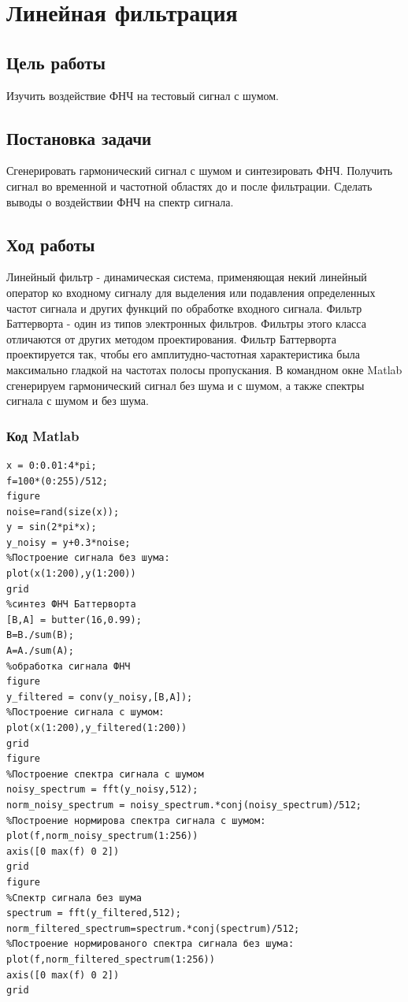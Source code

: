 \chapter{Линейная фильтрация}

\section{Цель работы}
Изучить воздействие ФНЧ на тестовый сигнал с шумом.

\section{Постановка задачи}
Сгенерировать гармонический сигнал с шумом и синтезировать ФНЧ. Получить сигнал во временной и частотной областях до и после фильтрации. Сделать выводы о воздействии ФНЧ на спектр сигнала.

\section{Ход работы}
Линейный фильтр - динамическая система, применяющая некий линейный оператор ко входному сигналу для выделения или подавления определенных частот сигнала и других функций по обработке входного сигнала.
Фильтр Баттерворта - один из типов электронных фильтров. Фильтры этого класса отличаются от других методом проектирования. Фильтр Баттерворта проектируется так, чтобы его амплитудно-частотная характеристика
была максимально гладкой на частотах полосы пропускания.
В командном окне Matlab сгенерируем гармонический сигнал без шума
и с шумом, а также спектры сигнала с шумом и без шума. 

\subsection{Код Matlab}
\begin{lstlisting}
x = 0:0.01:4*pi;
f=100*(0:255)/512;
figure
noise=rand(size(x));
y = sin(2*pi*x);
y_noisy = y+0.3*noise;
%Построение сигнала без шума:
plot(x(1:200),y(1:200))
grid
%синтез ФНЧ Баттерворта
[B,A] = butter(16,0.99);
B=B./sum(B);
A=A./sum(A);
%обработка сигнала ФНЧ
figure
y_filtered = conv(y_noisy,[B,A]);
%Построение сигнала с шумом:
plot(x(1:200),y_filtered(1:200))
grid
figure
%Построение спектра сигнала с шумом
noisy_spectrum = fft(y_noisy,512);
norm_noisy_spectrum = noisy_spectrum.*conj(noisy_spectrum)/512;
%Построение нормирова спектра сигнала с шумом:
plot(f,norm_noisy_spectrum(1:256))
axis([0 max(f) 0 2])
grid
figure
%Спектр сигнала без шума
spectrum = fft(y_filtered,512);
norm_filtered_spectrum=spectrum.*conj(spectrum)/512;
%Построение нормированого спектра сигнала без шума:
plot(f,norm_filtered_spectrum(1:256))
axis([0 max(f) 0 2])
grid

\end{lstlisting}

